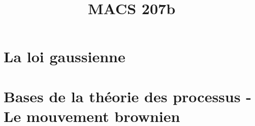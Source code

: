 \documentclass[a4paper,10pt]{article}
\title{\vspace{-1.2cm} \textbf{MACS 207b}}
\begin{document}
\maketitle

\vspace{-1.5cm}

\section{La loi gaussienne}
	

\section{Bases de la théorie des processus - Le mouvement brownien}
	
\end{document}
